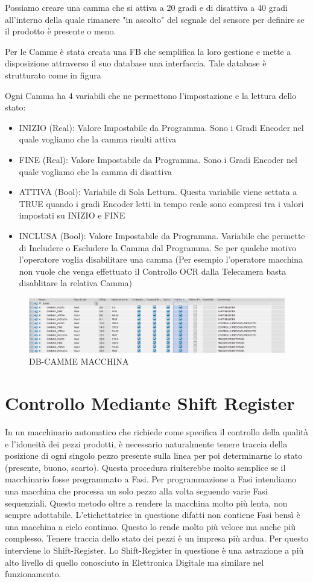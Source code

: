 \documentclass[12pt, a4paper, oneside]{book}
\begin{document}
Possiamo creare una camma che si attiva a 20 gradi e di disattiva a 40 gradi all'interno della quale rimanere "in ascolto" del segnale del sensore per definire se il prodotto è presente o meno.

Per le Camme è stata creata una FB che semplifica la loro gestione e mette a disposizione attraverso il suo database una interfaccia. Tale database è strutturato come in figura

Ogni Camma ha 4 variabili che ne permettono l'impostazione e la lettura dello stato:
\begin{itemize}
	\item INIZIO (Real): Valore Impostabile da Programma. Sono i Gradi Encoder nel quale vogliamo che la camma risulti attiva
	\item FINE (Real): Valore Impostabile da Programma. Sono i Gradi Encoder nel quale vogliamo che la camma di disattiva
	\item ATTIVA (Bool): Variabile di Sola Lettura. Questa variabile viene settata a TRUE quando i gradi Encoder letti in tempo reale sono compresi tra i valori impostati su INIZIO e FINE
	\item INCLUSA (Bool): Valore Impostabile da Programma. Variabile che permette di Includere o Escludere la Camma dal Programma. Se per qualche motivo l'operatore voglia disabilitare una camma (Per esempio l'operatore macchina non vuole che venga effettuato il Controllo OCR dalla Telecamera basta disablitare la relativa Camma)
\end{itemize}

\begin{figure}[H]
	\centering
	\includegraphics[width=12cm]{Immagini/CAM1}
	\caption{ DB-CAMME MACCHINA}
	\label{CAMME4}
\end{figure}


\section{Controllo Mediante Shift Register}
In un macchinario automatico che richiede come specifica il controllo della qualità e l'idoneità dei pezzi prodotti, è necessario naturalmente tenere traccia della posizione di ogni singolo pezzo presente sulla linea per poi determinarne lo stato (presente, buono, scarto). Questa procedura riulterebbe molto semplice se il macchinario fosse programmato a Fasi. Per programmazione a Fasi intendiamo una macchina che processa un solo pezzo alla volta seguendo varie Fasi sequenziali. Questo metodo oltre a rendere la macchina molto più lenta, non sempre adottabile. L'etichettatrice in questione difatti non contiene Fasi bensì è una macchina a ciclo continuo. Questo lo rende molto più veloce ma anche più complesso. Tenere traccia dello stato dei pezzi è un impresa più ardua. Per questo interviene lo Shift-Register.
Lo Shift-Register in questione è una astrazione a più alto livello di quello conosciuto in Elettronica Digitale ma similare nel funzionamento.
\end{document}
